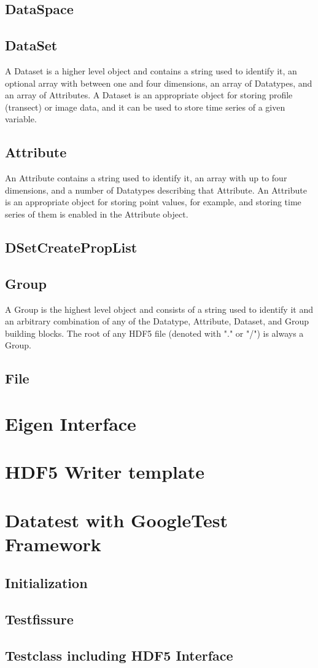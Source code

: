 \documentclass{article}
\begin{document}
\subsection{DataSpace}

\subsection{DataSet}
A Dataset is a higher level object and contains a string used to identify it, an optional array with between one and four dimensions, an array of Datatypes, and an array of Attributes.
A Dataset is an appropriate object for storing profile (transect) or image data, and it can be used to store time series of a given variable. 

\subsection{Attribute}
An Attribute contains a string used to identify it, an array with up to four dimensions, and a number of Datatypes describing that Attribute.
An Attribute is an appropriate object for storing point values, for example, and storing time series of them is enabled in the Attribute object. 
\subsection{DSetCreatePropList}
\subsection{Group}
A Group is the highest level object and consists of a string used to identify it and an arbitrary combination of any of the Datatype, Attribute, Dataset, and Group building blocks. The root of any HDF5 file (denoted with "." or "/") is always a Group. 
\subsection{File}

\section{Eigen Interface}

\section{HDF5 Writer template}

\section{Datatest with GoogleTest Framework}
\subsection{Initialization}
\subsection{Testfissure}
\subsection{Testclass including HDF5 Interface}






\end{document}
